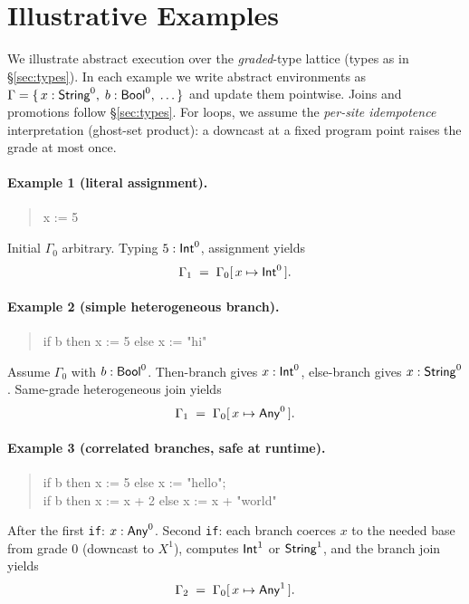 \section{Illustrative Examples}
\label{sec:examples}

We illustrate abstract execution over the \emph{graded}-type lattice (types as in \S\ref{sec:types}).  
In each example we write abstract environments as
$\Gamma = \{\, x : \mathsf{String}^{0},\; b : \mathsf{Bool}^{0},\;\dots \,\}$
and update them pointwise. Joins and promotions follow \S\ref{sec:types}.
For loops, we assume the \emph{per-site idempotence} interpretation (ghost-set product): a downcast at a fixed program point raises the grade at most once.

\paragraph{Example 1 (literal assignment).}
\begin{quote}\ttfamily
x := 5
\end{quote}
Initial $\Gamma_0$ arbitrary.  
Typing $5:\mathsf{Int}^{0}$, assignment yields
\[
\Gamma_1 \;=\; \Gamma_0[\,x \mapsto \mathsf{Int}^{0}\,].
\]

\paragraph{Example 2 (simple heterogeneous branch).}
\begin{quote}\ttfamily
if b then x := 5 else x := "hi"
\end{quote}
Assume $\Gamma_0$ with $b:\mathsf{Bool}^{0}$.  
Then-branch gives $x:\mathsf{Int}^{0}$, else-branch gives $x:\mathsf{String}^{0}$.  
Same-grade heterogeneous join yields
\[
\Gamma_1 \;=\; \Gamma_0[\,x \mapsto \mathsf{Any}^{0}\,].
\]

\paragraph{Example 3 (correlated branches, safe at runtime).}
\begin{quote}\ttfamily
if b then x := 5 else x := "hello";\\
if b then x := x + 2 else x := x + "world"
\end{quote}
After the first \texttt{if}: $x:\mathsf{Any}^{0}$.  
Second \texttt{if}: each branch coerces $x$ to the needed base from grade $0$ (downcast to $X^{1}$),
computes $\mathsf{Int}^{1}$ or $\mathsf{String}^{1}$, and the branch join yields
\[
\Gamma_2 \;=\; \Gamma_0[\,x \mapsto \mathsf{Any}^{1}\,].
\]

